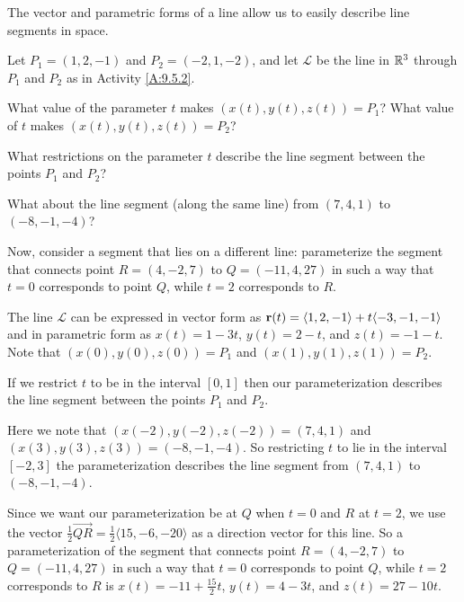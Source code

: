\begin{exercises} 

\item \label{Ez:9.5.1}   The vector and parametric forms of a line allow us to easily describe line segments in space. 

Let $P_1 = (1,2,-1)$ and $P_2 = (-2,1,-2)$, and let $\mathcal{L}$ be the line in $\mathbb{R}^3$ through $P_1$ and $P_2$ as in Activity \ref{A:9.5.2}.
\ba
	\item What value of the parameter $t$ makes $(x(t), y(t), z(t)) = P_1$? What value of $t$ makes $(x(t), y(t), z(t)) = P_2$?	
	\item What restrictions on the parameter $t$ describe the line segment between the points $P_1$ and $P_2$?
	\item What about the line segment (along the same line) from $(7,4,1)$ to $(-8,-1,-4)$?
	\item Now, consider a segment that lies on a different line:  parameterize the segment that connects point $R=(4,-2,7)$ to $Q=(-11,4,27)$ in such a way that $t = 0$ corresponds to point $Q$, while $t = 2$ corresponds to $R$.
	\ea

\begin{exerciseSolution}
	\ba
	\item The line $\mathcal{L}$ can be expressed in vector form as $\mathbf{r}(t) = \langle 1,2,-1\rangle + t\langle -3,-1,-1 \rangle$ and in parametric form as $x(t) = 1-3t$, $y(t) = 2-t$, and $z(t) = -1-t$. Note that $(x(0), y(0), z(0)) = P_1$ and $(x(1), y(1), z(1)) = P_2$. 
	\item If we restrict $t$ to be in the interval $[0,1]$ then our parameterization describes the line segment between the points $P_1$ and $P_2$.
	\item Here we note that $(x(-2), y(-2), z(-2)) = (7,4,1)$ and $(x(3), y(3), z(3)) = (-8,-1,-4)$. So restricting $t$ to lie in the interval $[-2,3]$ the parameterization describes the line segment from $(7,4,1)$ to $(-8,-1,-4)$.
	\item Since we want our parameterization be at $Q$ when $t=0$ and $R$ at $t=2$, we use the vector $\frac{1}{2}\overrightarrow{QR} = \frac{1}{2} \langle 15,-6,-20 \rangle$ as a direction vector for this line. So a parameterization of the segment that connects point $R=(4,-2,7)$ to $Q=(-11,4,27)$ in such a way that $t = 0$ corresponds to point $Q$, while $t = 2$ corresponds to $R$ is $x(t) = -11+\frac{15}{2}t$, $y(t) = 4-3t$, and $z(t) = 27-10t$.
	\ea
\end{exerciseSolution}


\end{exercises}
